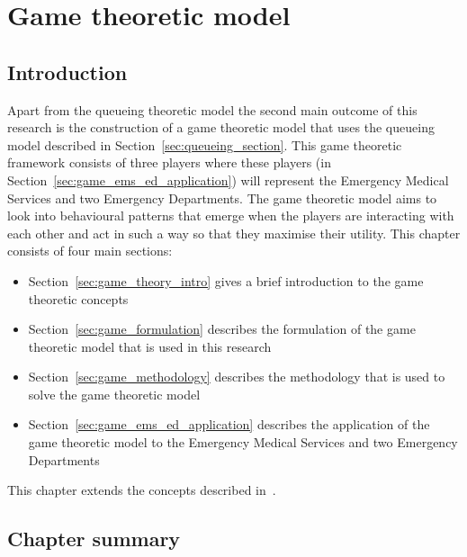 \chapter{Game theoretic model}\label{sec:game_theoretic_model}


\section{Introduction}

Apart from the queueing theoretic model the second main outcome of this research
is the construction of a game theoretic model that uses the queueing model
described in Section~\ref{sec:queueing_section}.
This game theoretic framework consists of three players where these players (in
Section~\ref{sec:game_ems_ed_application}) will represent the Emergency Medical
Services and two Emergency Departments.
The game theoretic model aims to look into behavioural patterns that emerge
when the players are interacting with each other and act in such a way so that
they maximise their utility. 
This chapter consists of four main sections:

\begin{itemize}
    \item Section~\ref{sec:game_theory_intro} gives a brief introduction to
    the game theoretic concepts
    \item Section~\ref{sec:game_formulation} describes the formulation of the
    game theoretic model that is used in this research
    \item Section~\ref{sec:game_methodology} describes the methodology that is
    used to solve the game theoretic model
    \item Section~\ref{sec:game_ems_ed_application} describes the application
    of the game theoretic model to the Emergency Medical Services and two
    Emergency Departments
\end{itemize}

This chapter extends the concepts described in~\cite{panayides2023game}.











\section{Chapter summary}

